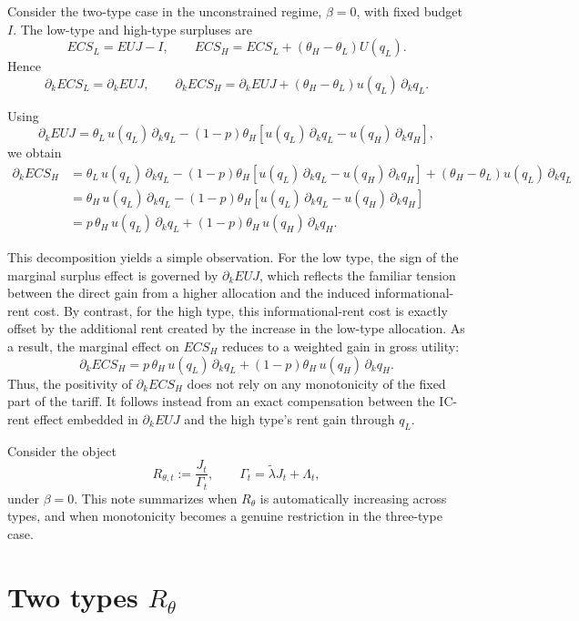 \documentclass[11pt]{article}
\begin{document}
Consider the two-type case in the unconstrained regime, \(\beta=0\), with fixed budget \(I\).
The low-type and high-type surpluses are
\[
ECS_L = EUJ - I,
\qquad
ECS_H = ECS_L + \left(\theta_H-\theta_L\right)U(q_L).
\]
Hence
\[
\partial_k ECS_L = \partial_k EUJ,
\qquad
\partial_k ECS_H
=
\partial_k EUJ
+
\left(\theta_H-\theta_L\right)u(q_L)\,\partial_k q_L.
\]

Using
\[
\partial_k EUJ
=
\theta_L\,u(q_L)\,\partial_k q_L
-
(1-p)\theta_H
\left[
u(q_L)\,\partial_k q_L-u(q_H)\,\partial_k q_H
\right],
\]
we obtain
\begin{align*}
\partial_k ECS_H
&=
\theta_L\,u(q_L)\,\partial_k q_L
-
(1-p)\theta_H
\left[
u(q_L)\,\partial_k q_L-u(q_H)\,\partial_k q_H
\right]
+
\left(\theta_H-\theta_L\right)u(q_L)\,\partial_k q_L \\
&=
\theta_H\,u(q_L)\,\partial_k q_L
-
(1-p)\theta_H
\left[
u(q_L)\,\partial_k q_L-u(q_H)\,\partial_k q_H
\right] \\
&=
p\,\theta_H\,u(q_L)\,\partial_k q_L
+
(1-p)\theta_H\,u(q_H)\,\partial_k q_H.
\end{align*}

This decomposition yields a simple observation. For the low type, the sign of the marginal surplus effect is governed by \(\partial_k EUJ\), which reflects the familiar tension between the direct gain from a higher allocation and the induced informational-rent cost. By contrast, for the high type, this informational-rent cost is exactly offset by the additional rent created by the increase in the low-type allocation. As a result, the marginal effect on \(ECS_H\) reduces to a weighted gain in gross utility:
\[
\partial_k ECS_H
=
p\,\theta_H\,u(q_L)\,\partial_k q_L
+
(1-p)\theta_H\,u(q_H)\,\partial_k q_H.
\]
Thus, the positivity of \(\partial_k ECS_H\) does not rely on any monotonicity of the fixed part of the tariff. It follows instead from an exact compensation between the IC-rent effect embedded in \(\partial_k EUJ\) and the high type's rent gain through \(q_L\).




Consider the object
\[
R_{\theta,t}:=\frac{J_t}{\Gamma_t},
\qquad
\Gamma_t=\tilde\lambda J_t+\Lambda_t,
\]
under $\beta=0$.
This note summarizes when $R_\theta$ is automatically increasing across types, and when monotonicity becomes a genuine restriction in the three-type case.

\section{Two types $R_\theta$}
\end{document}
